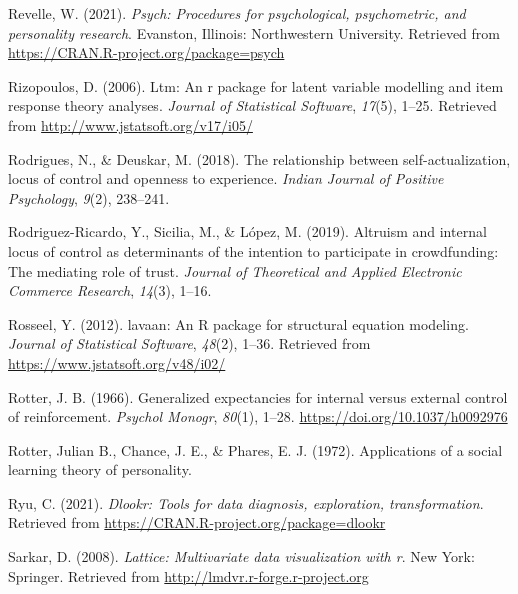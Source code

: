 \documentclass[
  english,
  man]{apa6}
\newlength{\cslhangindent}
\newlength{\cslentryspacingunit} %
\newenvironment{CSLReferences}[2] %
 {%
  \setlength{\parindent}{0pt}
  \ifodd #1
  \let\oldpar\par
  \def\par{\hangindent=\cslhangindent\oldpar}
  \fi
  \setlength{\parskip}{#2\cslentryspacingunit}
 }%
 {}
\begin{document}
\begin{CSLReferences}{1}{0}
\leavevmode{}%
Revelle, W. (2021). \emph{Psych: Procedures for psychological, psychometric, and personality research}. Evanston, Illinois: Northwestern University. Retrieved from \url{https://CRAN.R-project.org/package=psych}

\leavevmode{}%
Rizopoulos, D. (2006). Ltm: An r package for latent variable modelling and item response theory analyses. \emph{Journal of Statistical Software}, \emph{17}(5), 1--25. Retrieved from \url{http://www.jstatsoft.org/v17/i05/}

\leavevmode{}%
Rodrigues, N., \& Deuskar, M. (2018). The relationship between self-actualization, locus of control and openness to experience. \emph{Indian Journal of Positive Psychology}, \emph{9}(2), 238--241.

\leavevmode{}%
Rodriguez-Ricardo, Y., Sicilia, M., \& López, M. (2019). Altruism and internal locus of control as determinants of the intention to participate in crowdfunding: The mediating role of trust. \emph{Journal of Theoretical and Applied Electronic Commerce Research}, \emph{14}(3), 1--16.

\leavevmode{}%
Rosseel, Y. (2012). {lavaan}: An {R} package for structural equation modeling. \emph{Journal of Statistical Software}, \emph{48}(2), 1--36. Retrieved from \url{https://www.jstatsoft.org/v48/i02/}

\leavevmode{}%
Rotter, J. B. (1966). Generalized expectancies for internal versus external control of reinforcement. \emph{Psychol Monogr}, \emph{80}(1), 1--28. \url{https://doi.org/10.1037/h0092976}

\leavevmode{}%
Rotter, Julian B., Chance, J. E., \& Phares, E. J. (1972). Applications of a social learning theory of personality.

\leavevmode{}%
Ryu, C. (2021). \emph{Dlookr: Tools for data diagnosis, exploration, transformation}. Retrieved from \url{https://CRAN.R-project.org/package=dlookr}

\leavevmode{}%
Sarkar, D. (2008). \emph{Lattice: Multivariate data visualization with r}. New York: Springer. Retrieved from \url{http://lmdvr.r-forge.r-project.org}


\end{CSLReferences}
\end{document}
